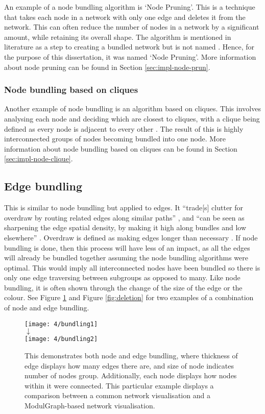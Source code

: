 \documentclass[../dissertation.tex]{subfiles}
\begin{document}
An example of a node bundling algorithm is `Node Pruning'. This is a technique that takes each node in a network with only one edge and deletes it from the network. This can often reduce the number of nodes in a network by a significant amount, while retaining its overall shape. The algorithm is mentioned in literature as a step to creating a bundled network but is not named \cite{brandes2003experiments}. Hence, for the purpose of this dissertation, it was named `Node Pruning'. More information about node pruning can be found in Section \ref{sec:impl-node-prun}.

\subsubsection{Node bundling based on cliques}
\label{sec:node-bundling-cliques}

Another example of node bundling is an algorithm based on cliques. This involves analysing each node and deciding which are closest to cliques, with a clique being defined as every node is adjacent to every other \cite{roberts1971characterization}. The result of this is highly interconnected groups of nodes becoming bundled into one node. More information about node bundling based on cliques can be found in Section \ref{sec:impl-node-clique}.

\subsection{Edge bundling}
\label{sec:edge_bundling}

This is similar to node bundling but applied to edges. It ``trade[s] clutter for overdraw by routing related edges along similar paths'' \cite{hurter2012graph}, and ``can be seen as sharpening the edge spatial density, by making it high along bundles and low elsewhere'' \cite{hurter2012graph}. Overdraw is defined as making edges longer than necessary \cite{gansner2011multilevel}. If node bundling is done, then this process will have less of an impact, as all the edges will already be bundled together assuming the node bundling algorithms were optimal. This would imply all interconnected nodes have been bundled so there is only one edge traversing between subgroups as opposed to many. Like node bundling, it is often shown through the change of the size of the edge or the colour. See Figure \ref{fig:bundling} and Figure \ref{fig:deletion} for two examples of a combination of node and edge bundling.
\begin{figure}[htb]
    \centering
    \texttt{[image: 4/bundling1]}
    \\$\downarrow$\\
    \texttt{[image: 4/bundling2]}
    \caption{This demonstrates both node and edge bundling, where thickness of edge displays how many edges there are, and size of node indicates number of nodes group. Additionally, each node displays how nodes within it were connected. This particular example displays a comparison between a common network visualisation and a ModulGraph-based network visualisation. \cite{li2015modulgraph}}
    \label{fig:bundling}
\end{figure}
\end{document}
